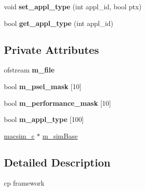 \begin{DoxyCompactItemize}
\item 
\hypertarget{classcache__partition__framework__c_a1150c459bb689173ef4c4127e42e08bd}{
void {\bfseries set\_\-appl\_\-type} (int appl\_\-id, bool ptx)}
\label{classcache__partition__framework__c_a1150c459bb689173ef4c4127e42e08bd}

\item 
\hypertarget{classcache__partition__framework__c_a6fbe580fd67fdf9019af059aa0d84b0f}{
bool {\bfseries get\_\-appl\_\-type} (int appl\_\-id)}
\label{classcache__partition__framework__c_a6fbe580fd67fdf9019af059aa0d84b0f}

\end{DoxyCompactItemize}
\subsection*{Private Attributes}
\begin{DoxyCompactItemize}
\item 
\hypertarget{classcache__partition__framework__c_a8584cb704b4ba9f401f1094ba7f478df}{
ofstream {\bfseries m\_\-file}}
\label{classcache__partition__framework__c_a8584cb704b4ba9f401f1094ba7f478df}

\item 
\hypertarget{classcache__partition__framework__c_af9b127ed6f8e7194b43f3f3857575a75}{
bool {\bfseries m\_\-psel\_\-mask} \mbox{[}10\mbox{]}}
\label{classcache__partition__framework__c_af9b127ed6f8e7194b43f3f3857575a75}

\item 
\hypertarget{classcache__partition__framework__c_a365d96845d50bfa12f130afcae7c716e}{
bool {\bfseries m\_\-performance\_\-mask} \mbox{[}10\mbox{]}}
\label{classcache__partition__framework__c_a365d96845d50bfa12f130afcae7c716e}

\item 
\hypertarget{classcache__partition__framework__c_a97a69fa2effb74f88305e622c8fe2d52}{
bool {\bfseries m\_\-appl\_\-type} \mbox{[}100\mbox{]}}
\label{classcache__partition__framework__c_a97a69fa2effb74f88305e622c8fe2d52}

\item 
\hyperlink{classmacsim__c}{macsim\_\-c} $\ast$ \hyperlink{classcache__partition__framework__c_acf0d0acfce51d2c198b919b0ac1c5edf}{m\_\-simBase}
\end{DoxyCompactItemize}


\subsection{Detailed Description}
cp framework 

